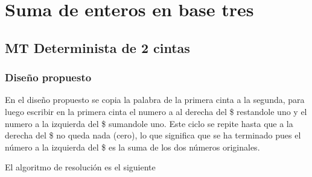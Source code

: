 \section{Suma de enteros en base tres}


\subsection{MT Determinista de 2 cintas}

\subsubsection*{Diseño propuesto}

En el diseño propuesto se copia la palabra de la primera cinta a la segunda, para luego escribir en la primera cinta el numero a al derecha del \$ restandole uno y el numero a la izquierda del \$ sumandole uno. Este ciclo se repite hasta que a la derecha del \$ no queda nada (cero), lo que significa que se ha terminado pues el número a la izquierda del \$ es la suma de los dos números originales.\medskip

El algoritmo de resolución es el siguiente

